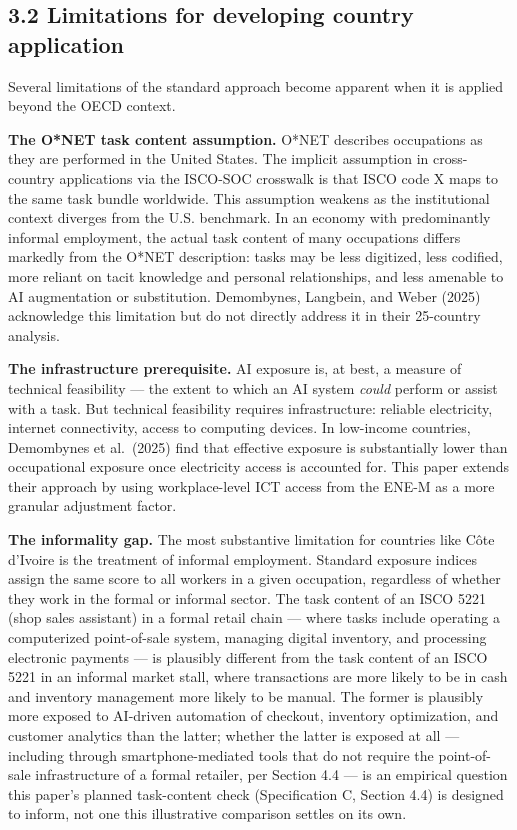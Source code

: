 \documentclass[
  11pt,
]{article}
\begin{document}
\subsection{3.2 Limitations for developing country
application}\label{limitations-for-developing-country-application}

Several limitations of the standard approach become apparent when it is
applied beyond the OECD context.

\textbf{The O*NET task content assumption.} O*NET describes occupations
as they are performed in the United States. The implicit assumption in
cross-country applications via the ISCO-SOC crosswalk is that ISCO code
X maps to the same task bundle worldwide. This assumption weakens as the
institutional context diverges from the U.S. benchmark. In an economy
with predominantly informal employment, the actual task content of many
occupations differs markedly from the O*NET description: tasks may be
less digitized, less codified, more reliant on tacit knowledge and
personal relationships, and less amenable to AI augmentation or
substitution. Demombynes, Langbein, and Weber (2025) acknowledge this
limitation but do not directly address it in their 25-country analysis.

\textbf{The infrastructure prerequisite.} AI exposure is, at best, a
measure of technical feasibility --- the extent to which an AI system
\emph{could} perform or assist with a task. But technical feasibility
requires infrastructure: reliable electricity, internet connectivity,
access to computing devices. In low-income countries, Demombynes et
al.~(2025) find that effective exposure is substantially lower than
occupational exposure once electricity access is accounted for. This
paper extends their approach by using workplace-level ICT access from
the ENE-M as a more granular adjustment factor.

\textbf{The informality gap.} The most substantive limitation for
countries like Côte d'Ivoire is the treatment of informal employment.
Standard exposure indices assign the same score to all workers in a
given occupation, regardless of whether they work in the formal or
informal sector. The task content of an ISCO 5221 (shop sales assistant)
in a formal retail chain --- where tasks include operating a
computerized point-of-sale system, managing digital inventory, and
processing electronic payments --- is plausibly different from the task
content of an ISCO 5221 in an informal market stall, where transactions
are more likely to be in cash and inventory management more likely to be
manual. The former is plausibly more exposed to AI-driven automation of
checkout, inventory optimization, and customer analytics than the
latter; whether the latter is exposed at all --- including through
smartphone-mediated tools that do not require the point-of-sale
infrastructure of a formal retailer, per Section 4.4 --- is an empirical
question this paper's planned task-content check (Specification C,
Section 4.4) is designed to inform, not one this illustrative comparison
settles on its own.
\end{document}
